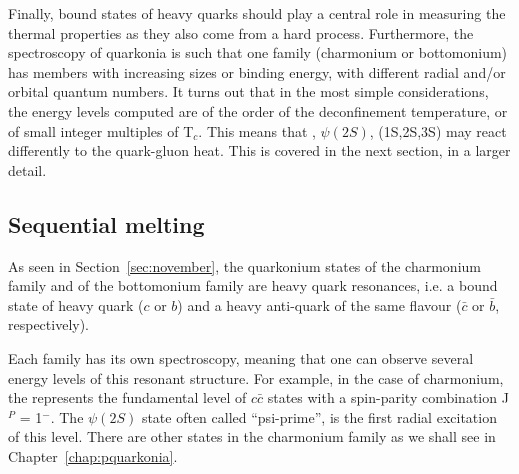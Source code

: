 Finally, bound states of heavy quarks should play a 
central role in measuring the thermal properties as they also come
from a hard process. Furthermore, the spectroscopy of quarkonia
is such that one family (charmonium or bottomonium) has members with
increasing sizes or binding energy, with different radial and/or orbital quantum numbers. It turns out that
in the most simple considerations, the energy levels computed are of
the order of the deconfinement temperature, or of small integer
multiples of T$_{c}$. This means that \Jpsi, $\psi(2S)$,
\PgU(1S,2S,3S) may react differently to the quark-gluon heat. This is
covered in the next section, in a larger detail.

\subsection{Sequential melting}



As seen in Section~\ref{sec:november}, the quarkonium states of the
charmonium family and of the bottomonium family are heavy quark resonances, i.e. a
bound state of heavy quark ($c$ or $b$) and a heavy anti-quark of the
same flavour ($\bar{c}$ or $\bar{b}$, respectively).

Each family has its own spectroscopy, meaning that one can observe
several energy levels of this resonant structure. For example, in the
case of charmonium, the \Jpsi represents the fundamental level of
$c\bar{c}$ states with a spin-parity combination J$^{P}$ =
1$^{-}$. The $\psi(2S)$ state often called ``psi-prime'', is the first radial
excitation of this level. There are other states in the charmonium
family as we shall see in Chapter~\ref{chap:pquarkonia}.


